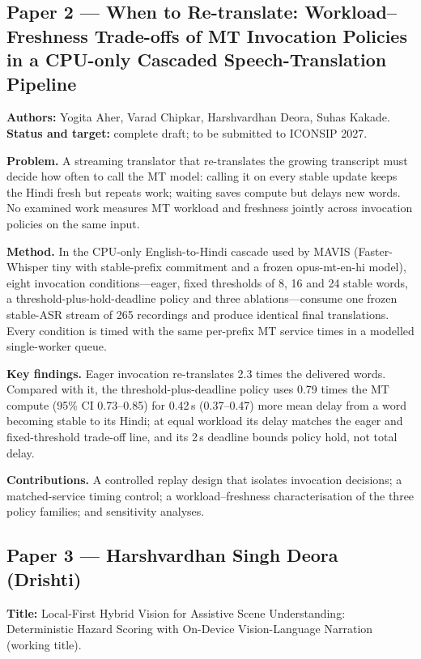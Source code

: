 \documentclass[12pt,singleside,a4paper]{article}
\begin{document}
\subsection{Paper 2 --- When to Re-translate: Workload--Freshness Trade-offs of MT Invocation Policies in a CPU-only Cascaded Speech-Translation Pipeline}
\textbf{Authors:} Yogita Aher, Varad Chipkar, Harshvardhan Deora, Suhas Kakade.\\
\textbf{Status and target:} complete draft; to be submitted to ICONSIP 2027.

\textbf{Problem.} A streaming translator that re-translates the growing transcript must decide how often to call the MT model: calling it on every stable update keeps the Hindi fresh but repeats work; waiting saves compute but delays new words. No examined work measures MT workload and freshness jointly across invocation policies on the same input.

\textbf{Method.} In the CPU-only English-to-Hindi cascade used by MAVIS (Faster-Whisper tiny with stable-prefix commitment and a frozen opus-mt-en-hi model), eight invocation conditions---eager, fixed thresholds of 8, 16 and 24 stable words, a threshold-plus-hold-deadline policy and three ablations---consume one frozen stable-ASR stream of 265 recordings and produce identical final translations. Every condition is timed with the same per-prefix MT service times in a modelled single-worker queue.

\textbf{Key findings.} Eager invocation re-translates 2.3 times the delivered words. Compared with it, the threshold-plus-deadline policy uses 0.79 times the MT compute (95\% CI 0.73--0.85) for 0.42\,s (0.37--0.47) more mean delay from a word becoming stable to its Hindi; at equal workload its delay matches the eager and fixed-threshold trade-off line, and its 2\,s deadline bounds policy hold, not total delay.

\textbf{Contributions.} A controlled replay design that isolates invocation decisions; a matched-service timing control; a workload--freshness characterisation of the three policy families; and sensitivity analyses.

\subsection{Paper 3 --- Harshvardhan Singh Deora (Drishti)}
\textbf{Title:} Local-First Hybrid Vision for Assistive Scene Understanding: Deterministic Hazard Scoring with On-Device Vision-Language Narration (working title).
\end{document}
